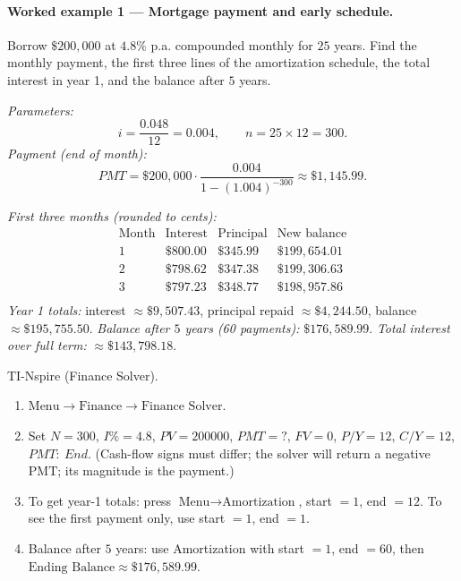\documentclass[11pt]{article}
\def\textbf#1{#1}%
\def\mathrm#1{#1}%
\begin{document}
\paragraph*{Worked example 1 — Mortgage payment and early schedule.}
Borrow \(\$200{,}000\) at \(4.8\%\) p.a. compounded monthly for \(25\) years.
Find the monthly payment, the first three lines of the amortization schedule,
the total interest in year 1, and the balance after \(5\) years.

\emph{Parameters:}
\[
i=\frac{0.048}{12}=0.004,\qquad n=25\times 12=300.
\]
\emph{Payment (end of month):}
\[
\mathrm{PMT}=\$200{,}000\cdot\frac{0.004}{1-(1.004)^{-300}}
\approx \boxed{\$1{,}145.99}.
\]

\emph{First three months (rounded to cents):}
\[
\begin{array}{r|r|r|r}
\text{Month}&\text{Interest}&\text{Principal}&\text{New balance}\\ \hline
1&\$800.00&\$345.99&\$199{,}654.01\\
2&\$798.62&\$347.38&\$199{,}306.63\\
3&\$797.23&\$348.77&\$198{,}957.86\\
\end{array}
\]
\emph{Year 1 totals:} interest \(\approx \$9{,}507.43\), principal repaid \(\approx \$4{,}244.50\), balance \(\approx \$195{,}755.50\).  
\emph{Balance after \(5\) years (60 payments):} \(\boxed{\$176{,}589.99}\).  
\emph{Total interest over full term:} \(\approx \$143{,}798.18\).

\textbf{TI-Nspire (Finance Solver).}
\begin{enumerate}[itemsep=1pt]
  \item \(\text{Menu}\to\text{Finance}\to\text{Finance Solver}\).
  \item Set \(\textbf{N}=300\), \(\textbf{I\%}=4.8\), \(\textbf{PV}=200000\),
        \(\textbf{PMT}=?\), \(\textbf{FV}=0\), \(\textbf{P/Y}=12\), \(\textbf{C/Y}=12\), \(\textbf{PMT:\ End}\).
        (Cash-flow signs must differ; the solver will return a negative \(\text{PMT}\);
        its magnitude is the payment.)
  \item To get year-1 totals: press \(\text{Menu}\to\text{Amortization}\),
        start \(=1\), end \(=12\).  
        To see the first payment only, use start \(=1\), end \(=1\).
  \item Balance after \(5\) years: use Amortization with start \(=1\), end \(=60\),
        then \(\text{Ending Balance}\approx \$176{,}589.99\).
\end{enumerate}
\end{document}
